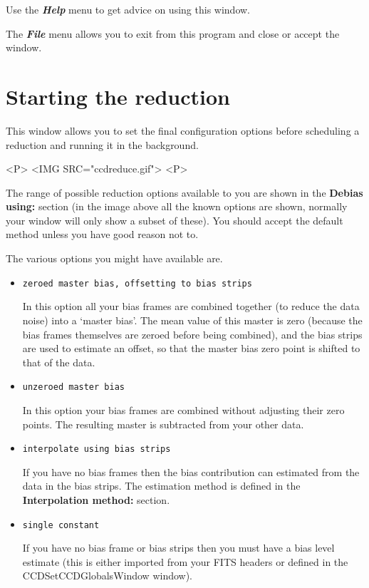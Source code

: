 \documentclass[11pt,nolof]{starlink}
\providecommand{\menu}[1]{{\bf \em #1}}
\providecommand{\wlab}[1]{{\bf #1}}
\providecommand{\text}[1]{{\tt #1}}
\begin{document}
Use the \menu{Help} menu to get advice on using this window.

The \menu{File} menu allows you to exit from this program and close or
accept the window.

\section{Starting the reduction }
This window allows you to set the final configuration options before
scheduling a reduction and running it in the background.
\begin{html}
<P>
<IMG SRC="ccdreduce.gif">
<P>
\end{html}


The range of possible reduction options
available to you are shown in the \wlab{Debias using:} section (in the
image above all the known options are shown, normally your window will
only show a subset of these). You should accept the default method
unless you have good reason not to.

The various options you might have available are.
\begin{itemize}
\item \text{zeroed master bias, offsetting to bias strips}

In this option all your bias frames are combined together (to reduce
the data noise) into a `master bias'. The mean value of this master is
zero (because the bias frames themselves are zeroed before being
combined), and the bias strips are used to estimate an offset, so that
the master bias zero point is shifted to that of the data.

\item \text{unzeroed master bias}

In this option your bias frames are combined without adjusting their
zero points. The resulting master is subtracted from your other data.

\item \text{interpolate using bias strips}

If you have no bias frames then the bias contribution can estimated
from the data in the bias strips. The estimation method is defined in
the \wlab{Interpolation method:} section.

\item \text{single constant}

If you have no bias frame or bias strips then you must have a bias
level estimate (this is either imported from your FITS headers or
defined in the \htmlref{\wlab{CCD characteristics}}
{CCDSetCCDGlobalsWindow} window).

\end{itemize}
\end{document}
